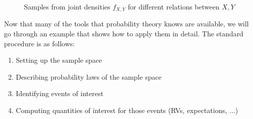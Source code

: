 \begin{figure}
\centering

\iffalse
{

\def\Square{(-2.5,-2.5) rectangle (2.5,2.5)}
\def\EllipseA{(0,0) ellipse [rotate=-45, x radius=0.8, y radius=2]}
\def\EllipseB{(0,0) ellipse [rotate=45, x radius=0.8, y radius=2]}


\subfloat[Uncorrelated ($\Cov(X, Y) = 0$)]{
\begin{tikzpicture}
\draw \Square;
\draw[pattern=north west lines, pattern color=black] circle(1.6);\Circle;
\end{tikzpicture}
}
%
\subfloat[Correlated ($\Cov(X, Y) > 0$)]{
\begin{tikzpicture}
\draw \Square;
\draw[pattern=north west lines, pattern color=black] \EllipseA;
\end{tikzpicture}
}
%
\subfloat[Anticorrelated ($\Cov(X, Y) < 0$)]{
\begin{tikzpicture}
\draw \Square;
\draw[pattern=north west lines, pattern color=black] \EllipseB;
\end{tikzpicture}
}

\caption{Schematic plot of joint densities $f_{X, Y}$ for different relations between $X, Y$}

}
\fi

%
%


\caption{Samples from joint densities $f_{X, Y}$ for different relations between $X, Y$}
\label{fig:correlations}
\end{figure}



Now that many of the tools that probability theory knows are available, we will go through an example that shows how to apply them in detail. The standard procedure is as follows:
\begin{enumerate}
\item Setting up the sample space

\item Describing probability laws of the sample space

\item Identifying events of interest

\item Computing quantities of interest for those events (RVs, expectations, ...)
\end{enumerate}


